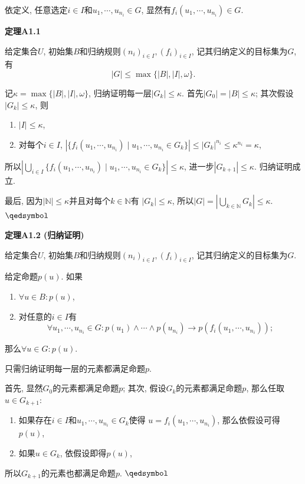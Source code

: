 \documentclass[UTF8]{ctexart}
\begin{document}
\vspace{10pt}

依定义, 任意选定$i\in I$和$u_1,\cdots,u_{n_i}\in G$,
显然有$f_i(u_1,\cdots,u_{n_i})\in G$.

\vspace{10pt}

\hypertarget{sec:定理A1.1}{}
\noindent\textbf{定理A1.1}

给定集合$U$, 初始集$B$和归纳规则$(n_i)_{i\in I},(f_i)_{i\in I}$,
记其归纳定义的目标集为$G$, 有
\[
    |G|\leqslant\max\{|B|,|I|,\omega\}.
\]


记$\kappa=\max\{|B|,|I|,\omega\}$, 归纳证明每一层$|G_k|\leqslant\kappa$.
首先$|G_0|=|B|\leqslant\kappa$; 其次假设$|G_k|\leqslant\kappa$, 则
\begin{enumerate}
    \item $|I|\leqslant\kappa$,
    \item 对每个$i\in I$, $|\{f_i(u_1,\cdots,u_{n_i})\mid
    u_1,\cdots,u_{n_i}\in G_k\}|\leqslant|G_k|^{n_i}\leqslant\kappa^{n_i}=\kappa$,
\end{enumerate}
所以$\displaystyle\left|\bigcup_{i\in I}\{f_i(u_1,\cdots,u_{n_i})\mid
u_1,\cdots,u_{n_i}\in G_k\}\right|\leqslant\kappa$,
进一步$|G_{k+1}|\leqslant\kappa$. 归纳证明成立.

最后, 因为$|\mathbb{N}|\leqslant\kappa$并且对每个$k\in\mathbb{N}$有
$|G_k|\leqslant\kappa$, 所以$\displaystyle
|G|=\left|\bigcup_{k\in\mathbb{N}}G_k\right|\leqslant\kappa$. \hfill $\qedsymbol$

\vspace{10pt}

\hypertarget{sec:定理A1.2}{}
\noindent\textbf{定理A1.2 (归纳证明)}

给定集合$U$, 初始集$B$和归纳规则$(n_i)_{i\in I},(f_i)_{i\in I}$,
记其归纳定义的目标集为$G$.

给定命题$p(u)$. 如果
\begin{enumerate}
    \item $\forall u\in B:p(u)$,
    \item 对任意的$i\in I$有
    \[
        \forall u_1,\cdots,u_{n_i}\in G:p(u_1)\land\cdots\land p(u_{n_i})\to
        p(f_i(u_1,\cdots,u_{n_i}));
    \]
\end{enumerate}
那么$\forall u\in G:p(u)$.


只需归纳证明每一层的元素都满足命题$p$.

首先, 显然$G_0$的元素都满足命题$p$;
其次, 假设$G_k$的元素都满足命题$p$, 那么任取$u\in G_{k+1}$:
\begin{enumerate}
    \item 如果存在$i\in I$和$u_1,\cdots,u_{n_i}\in G_k$使得
    $u=f_i(u_1,\cdots,u_{n_i})$, 那么依假设可得$p(u)$,
    \item 如果$u\in G_k$, 依假设即得$p(u)$,
\end{enumerate}
所以$G_{k+1}$的元素也都满足命题$p$. {\hfill $\qedsymbol$}
\end{document}

